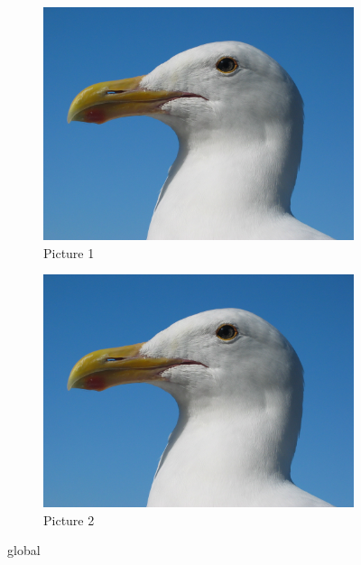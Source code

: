 \begin{figure}
	\centering
	
  	\begin{subfigure}[b]{0.4\textwidth}
    		\includegraphics[width=\textwidth]{images/gull}
    		\caption{Picture 1}
    		\label{fig:1}
  	\end{subfigure}
  	\begin{subfigure}[b]{0.4\textwidth}
    		\includegraphics[width=\textwidth]{images/gull}
    		\caption{Picture 2}
    		\label{fig:2}
  	\end{subfigure}
	
	\caption{global}
\end{figure}



